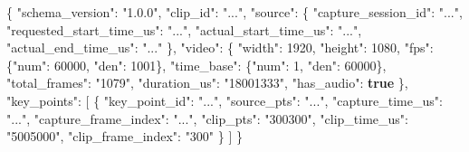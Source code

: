 \documentclass[
  9pt,
  a4paper,
]{article}
\newenvironment{Shaded}{}{}
\newcommand{\DataTypeTok}[1]{\textcolor[rgb]{0.56,0.13,0.00}{#1}}
\newcommand{\DecValTok}[1]{\textcolor[rgb]{0.25,0.63,0.44}{#1}}
\newcommand{\FunctionTok}[1]{\textcolor[rgb]{0.02,0.16,0.49}{#1}}
\newcommand{\KeywordTok}[1]{\textcolor[rgb]{0.00,0.44,0.13}{\textbf{#1}}}
\newcommand{\OtherTok}[1]{\textcolor[rgb]{0.00,0.44,0.13}{#1}}
\newcommand{\StringTok}[1]{\textcolor[rgb]{0.25,0.44,0.63}{#1}}
\begin{document}
\begin{Shaded}
\begin{Highlighting}[]
\FunctionTok{\{}
  \DataTypeTok{"schema\_\allowbreak{}version"}\FunctionTok{:} \StringTok{"1.0.0"}\FunctionTok{,}
  \DataTypeTok{"clip\_\allowbreak{}id"}\FunctionTok{:} \StringTok{"..."}\FunctionTok{,}
  \DataTypeTok{"source"}\FunctionTok{:} \FunctionTok{\{}
    \DataTypeTok{"capture\_\allowbreak{}session\_\allowbreak{}id"}\FunctionTok{:} \StringTok{"..."}\FunctionTok{,}
    \DataTypeTok{"requested\_\allowbreak{}start\_\allowbreak{}time\_\allowbreak{}us"}\FunctionTok{:} \StringTok{"..."}\FunctionTok{,}
    \DataTypeTok{"actual\_\allowbreak{}start\_\allowbreak{}time\_\allowbreak{}us"}\FunctionTok{:} \StringTok{"..."}\FunctionTok{,}
    \DataTypeTok{"actual\_\allowbreak{}end\_\allowbreak{}time\_\allowbreak{}us"}\FunctionTok{:} \StringTok{"..."}
  \FunctionTok{\},}
  \DataTypeTok{"video"}\FunctionTok{:} \FunctionTok{\{}
    \DataTypeTok{"width"}\FunctionTok{:} \DecValTok{1920}\FunctionTok{,}
    \DataTypeTok{"height"}\FunctionTok{:} \DecValTok{1080}\FunctionTok{,}
    \DataTypeTok{"fps"}\FunctionTok{:} \FunctionTok{\{}\DataTypeTok{"num"}\FunctionTok{:} \DecValTok{60000}\FunctionTok{,} \DataTypeTok{"den"}\FunctionTok{:} \DecValTok{1001}\FunctionTok{\},}
    \DataTypeTok{"time\_\allowbreak{}base"}\FunctionTok{:} \FunctionTok{\{}\DataTypeTok{"num"}\FunctionTok{:} \DecValTok{1}\FunctionTok{,} \DataTypeTok{"den"}\FunctionTok{:} \DecValTok{60000}\FunctionTok{\},}
    \DataTypeTok{"total\_\allowbreak{}frames"}\FunctionTok{:} \StringTok{"1079"}\FunctionTok{,}
    \DataTypeTok{"duration\_\allowbreak{}us"}\FunctionTok{:} \StringTok{"18001333"}\FunctionTok{,}
    \DataTypeTok{"has\_\allowbreak{}audio"}\FunctionTok{:} \KeywordTok{true}
  \FunctionTok{\},}
  \DataTypeTok{"key\_\allowbreak{}points"}\FunctionTok{:} \OtherTok{[}
    \FunctionTok{\{}
      \DataTypeTok{"key\_\allowbreak{}point\_\allowbreak{}id"}\FunctionTok{:} \StringTok{"..."}\FunctionTok{,}
      \DataTypeTok{"source\_\allowbreak{}pts"}\FunctionTok{:} \StringTok{"..."}\FunctionTok{,}
      \DataTypeTok{"capture\_\allowbreak{}time\_\allowbreak{}us"}\FunctionTok{:} \StringTok{"..."}\FunctionTok{,}
      \DataTypeTok{"capture\_\allowbreak{}frame\_\allowbreak{}index"}\FunctionTok{:} \StringTok{"..."}\FunctionTok{,}
      \DataTypeTok{"clip\_\allowbreak{}pts"}\FunctionTok{:} \StringTok{"300300"}\FunctionTok{,}
      \DataTypeTok{"clip\_\allowbreak{}time\_\allowbreak{}us"}\FunctionTok{:} \StringTok{"5005000"}\FunctionTok{,}
      \DataTypeTok{"clip\_\allowbreak{}frame\_\allowbreak{}index"}\FunctionTok{:} \StringTok{"300"}
    \FunctionTok{\}}
  \OtherTok{]}
\FunctionTok{\}}
\end{Highlighting}
\end{Shaded}
\end{document}
